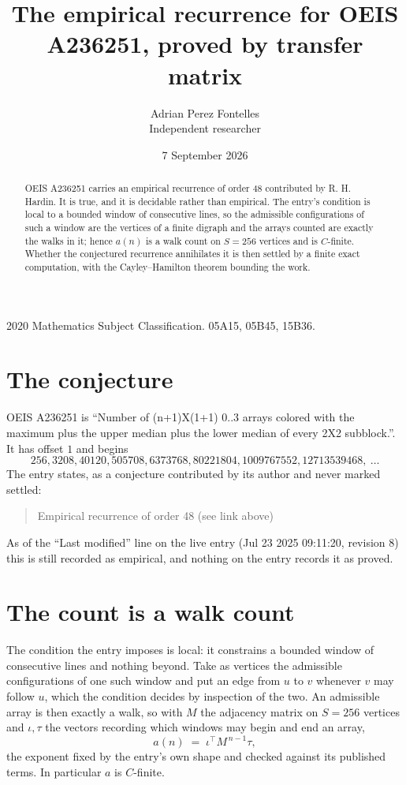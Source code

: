 \documentclass[11pt,a4paper]{article}
\title{The empirical recurrence for OEIS A236251, proved by transfer matrix}
\author{Adrian Perez Fontelles\\ \small Independent researcher}
\date{7 September 2026}
\theoremstyle{plain}
\theoremstyle{definition}
\begin{document}
\maketitle

\begin{abstract}
OEIS A236251 carries an empirical recurrence of order $48$ contributed by R. H. Hardin. It is
true, and it is decidable rather than empirical. The entry's condition is local to a bounded window of consecutive lines, so
the admissible configurations of such a window are the vertices of a finite digraph and the
arrays counted are exactly the walks in it; hence $a(n)$ is a walk count on $S=256$ vertices
and is $C$-finite. Whether the conjectured recurrence annihilates it is then settled by a
finite exact computation, with the Cayley--Hamilton theorem bounding the work.
\end{abstract}

\noindent\small 2020 Mathematics Subject Classification. 05A15, 05B45, 15B36.\normalsize

\section{The conjecture}

OEIS A236251 is ``Number of (n+1)X(1+1) 0..3 arrays colored with the maximum plus the upper median plus the lower median of every 2X2 subblock.''. It has offset $1$ and begins
\[
256, 3208, 40120, 505708, 6373768, 80221804, 1009767552, 12713539468,\ \dots
\]
The entry states, as a conjecture contributed by its author and never marked settled:
\begin{quote}
Empirical recurrence of order 48 (see link above)
\end{quote}
As of the ``Last modified'' line on the live entry (Jul 23 2025 09:11:20, revision 8) this is still
recorded as empirical, and nothing on the entry records it as proved.

\section{The count is a walk count}

The condition the entry imposes is local: it constrains a bounded window of consecutive lines and nothing beyond. Take as
vertices the admissible configurations of one such window and put an edge from $u$ to $v$
whenever $v$ may follow $u$, which the condition decides by inspection of the two. An
admissible array is then exactly a walk, so with $M$ the adjacency matrix on $S=256$ vertices
and $\iota,\tau$ the vectors recording which windows may begin and end an array,
\[
a(n)\;=\;\iota^{\!\top}M^{\,n-1}\tau ,
\]
the exponent fixed by the entry's own shape and checked against its published terms. In
particular $a$ is $C$-finite.
\end{document}
